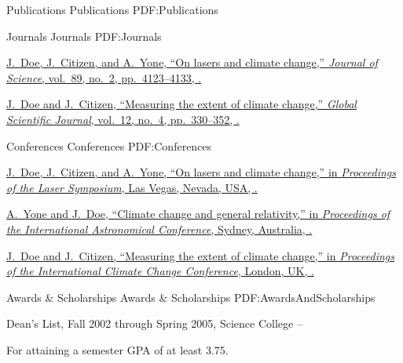 \documentclass[letterpaper,MMMyyyy,nonstopmode]{simpleresumecv}
\begin{document}
\begin{Body}
\begin{Detail}
\begin{Detail}
\begin{Detail}

\Section
{Publications}
{Publications}
{PDF:Publications}

\SubSection
{Journals}
{Journals}
{PDF:Journals}

\begingroup
\renewcommand{\MaxNumberedItem}{[88]}

\Gap
\NumberedItem{[10]}
\href{http://www.example.com/my-paper-doi-5}
{\underline{J.~Doe}, J.~Citizen, and A.~Yone,
``On lasers and climate change,''
\textit{Journal of Science},
vol.~89,
no.~2,
pp.~4123--4133,
.}

\Gap
\NumberedItem{[1]}
\href{http://www.example.com/my-paper-doi-4}
{\underline{J.~Doe} and J.~Citizen,
``Measuring the extent of climate change,''
\textit{Global Scientific Journal},
vol.~12,
no.~4,
pp.~330--352,
.}

\endgroup

\BigGap
\SubSection
{Conferences}
{Conferences}
{PDF:Conferences}

\begingroup
\renewcommand{\MaxNumberedItem}{[8888]}

\Gap
\NumberedItem{[1000]}
\href{http://www.example.com/my-paper-doi-3}
{\underline{J.~Doe}, J.~Citizen, and A.~Yone,
``On lasers and climate change,''
in \textit{Proceedings of the Laser Symposium},
Las Vegas, Nevada, USA,
.}

\Gap
\NumberedItem{[100]}
\href{http://www.example.com/my-paper-doi-2}
{A.~Yone and \underline{J.~Doe},
``Climate change and general relativity,''
in \textit{Proceedings of the International Astronomical Conference},
Sydney, Australia,
.}

\Gap
\NumberedItem{[10]}
\href{http://www.example.com/my-paper-doi-1}
{\underline{J.~Doe} and J.~Citizen,
``Measuring the extent of climate change,''
in \textit{Proceedings of the International Climate Change Conference},
London, UK,
.}

\endgroup


\Section
{Awards \&\newline
Scholarships}
{Awards \& Scholarships}
{PDF:AwardsAndScholarships}

\BulletItem
Dean's List,
Fall 2002 through Spring 2005,
Science College
\hfill
{} --
\begin{Detail}
\Item
For attaining a semester GPA of at least 3.75.
\end{Detail}


\end{Detail}
\end{Detail}
\end{Detail}
\end{Body}
\end{document}
